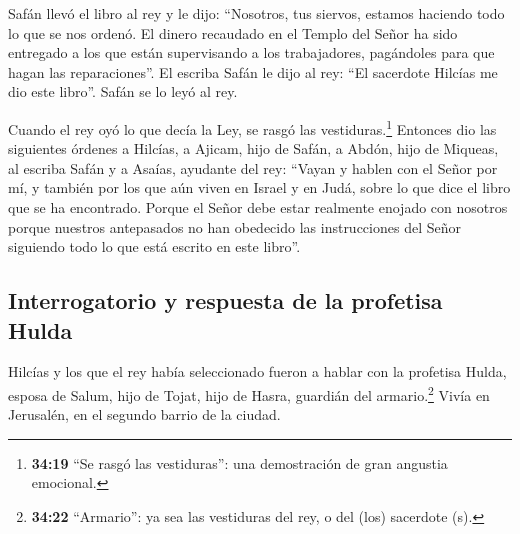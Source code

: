  Safán llevó el libro al rey y le dijo: ``Nosotros, tus
siervos, estamos haciendo todo lo que se nos ordenó.  El
dinero recaudado en el Templo del Señor ha sido entregado a los que
están supervisando a los trabajadores, pagándoles para que hagan las
reparaciones''.  El escriba Safán le dijo al rey: ``El
sacerdote Hilcías me dio este libro''. Safán se lo leyó al rey.

 Cuando el rey oyó lo que decía la Ley, se rasgó las
vestiduras.\footnote{\textbf{34:19} ``Se rasgó las vestiduras'': una
  demostración de gran angustia emocional.}  Entonces dio
las siguientes órdenes a Hilcías, a Ajicam, hijo de Safán, a Abdón, hijo
de Miqueas, al escriba Safán y a Asaías, ayudante del rey:
 ``Vayan y hablen con el Señor por mí, y también por los
que aún viven en Israel y en Judá, sobre lo que dice el libro que se ha
encontrado. Porque el Señor debe estar realmente enojado con nosotros
porque nuestros antepasados no han obedecido las instrucciones del Señor
siguiendo todo lo que está escrito en este libro''.

\hypertarget{interrogatorio-y-respuesta-de-la-profetisa-hulda}{%
\subsection{Interrogatorio y respuesta de la profetisa
Hulda}\label{interrogatorio-y-respuesta-de-la-profetisa-hulda}}

 Hilcías y los que el rey había seleccionado fueron a
hablar con la profetisa Hulda, esposa de Salum, hijo de Tojat, hijo de
Hasra, guardián del armario.\footnote{\textbf{34:22} ``Armario'': ya sea
  las vestiduras del rey, o del (los) sacerdote (s).} Vivía en
Jerusalén, en el segundo barrio de la ciudad.

